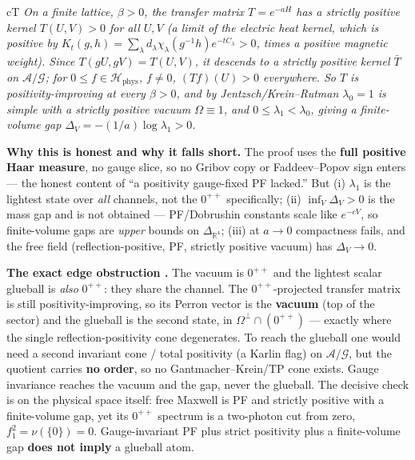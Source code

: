 
\begin{claimbox}{cT}
 \emph{On a finite lattice, $\beta>0$, the transfer
matrix $T=e^{-aH}$ has a strictly positive kernel $T(U,V)>0$ for all $U,V$ (a limit of the
electric heat kernel, which is positive by
$K_t(g,h)=\sum_\lambda d_\lambda\chi_\lambda(g^{-1}h)e^{-tC_\lambda}>0$, times a positive
magnetic weight). Since $T(gU,gV)=T(U,V)$, it descends to a strictly positive kernel
$\bar T$ on $\mathcal{A}/\mathcal{G}$; for $0\le f\in \mathcal{H}_{\mathrm{phys}}$, $f\ne0$,
$(Tf)(U)>0$ everywhere. So $T$ is positivity-improving at every $\beta>0$, and by
Jentzsch/Krein--Rutman $\lambda_0=1$ is simple with a strictly positive vacuum $\Omega\equiv1$,
and $0\le\lambda_1<\lambda_0$, giving a finite-volume gap
$\Delta_V=-(1/a)\log\lambda_1>0$.}
\end{claimbox}
\label{thm:pf}

\textbf{Why this is honest and why it falls short.} The proof uses the \textbf{full positive Haar
measure}, no gauge slice, so no Gribov copy or Faddeev--Popov sign enters --- the honest content
of ``a positivity gauge-fixed PF lacked.'' But (i) $\lambda_1$ is the lightest state over
\emph{all} channels, not the $0^{++}$ specifically; (ii) $\inf_V\Delta_V>0$ is the mass gap and
is not obtained --- PF/Dobrushin constants scale like $e^{-cV}$, so finite-volume gaps are
\emph{upper} bounds on $\Delta_{\mathbb{R}^4}$; (iii) at $a\to0$ compactness fails, and the free
field (reflection-positive, PF, strictly positive vacuum) has $\Delta_V\to0$.

\textbf{The exact edge obstruction \LN.} The vacuum is $0^{++}$ and the lightest scalar
glueball is \emph{also} $0^{++}$: they share the channel. The $0^{++}$-projected transfer matrix
is still positivity-improving, so its Perron vector is the \textbf{vacuum} (top of the sector)
and the glueball is the second state, in $\Omega^\perp\cap(0^{++})$ --- exactly where the single
reflection-positivity cone degenerates. To reach the glueball one would need a second invariant
cone / total positivity (a Karlin flag) on $\mathcal{A}/\mathcal{G}$, but the quotient carries
\textbf{no order}, so no Gantmacher--Krein/TP cone exists. Gauge invariance reaches the vacuum
and the gap, never the glueball. The decisive check is on the physical space itself: free
Maxwell is PF and strictly positive with a finite-volume gap, yet its $0^{++}$ spectrum is a
two-photon cut from zero, $f_1^2=\nu(\{0\})=0$. Gauge-invariant PF plus strict positivity plus a
finite-volume gap \textbf{does not imply} a glueball atom.

